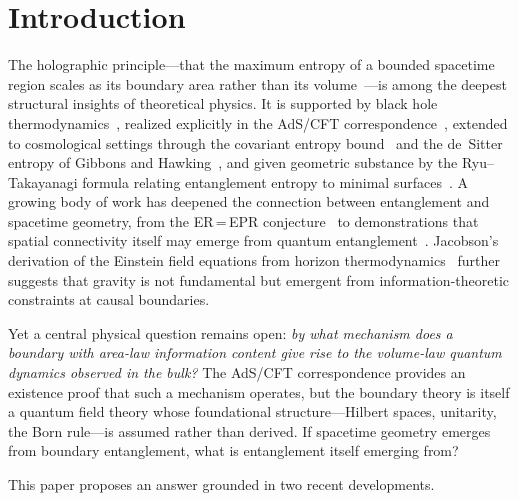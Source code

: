 \documentclass[aps,prd,twocolumn,superscriptaddress,nofootinbib]{revtex4-2}
\begin{document}
\section{Introduction}
\label{sec:intro}

The holographic principle---that the maximum entropy of a bounded spacetime region scales as its boundary area rather than its volume~\cite{tHooft1993,Susskind1995}---is among the deepest structural insights of theoretical physics. It is supported by black hole thermodynamics~\cite{Bekenstein1973,Hawking1975}, realized explicitly in the AdS/CFT correspondence~\cite{Maldacena1999}, extended to cosmological settings through the covariant entropy bound~\cite{Bousso1999} and the de~Sitter entropy of Gibbons and Hawking~\cite{GibbonsHawking1977}, and given geometric substance by the Ryu--Takayanagi formula relating entanglement entropy to minimal surfaces~\cite{RyuTakayanagi2006}. A growing body of work has deepened the connection between entanglement and spacetime geometry, from the ER\,=\,EPR conjecture~\cite{MaldacenaSusskind2013} to demonstrations that spatial connectivity itself may emerge from quantum entanglement~\cite{VanRaamsdonk2010,CaoCarrollMichalakis2017}. Jacobson's derivation of the Einstein field equations from horizon thermodynamics~\cite{Jacobson1995} further suggests that gravity is not fundamental but emergent from information-theoretic constraints at causal boundaries.

Yet a central physical question remains open: \emph{by what mechanism does a boundary with area-law information content give rise to the volume-law quantum dynamics observed in the bulk?} The AdS/CFT correspondence provides an existence proof that such a mechanism operates, but the boundary theory is itself a quantum field theory whose foundational structure---Hilbert spaces, unitarity, the Born rule---is assumed rather than derived. If spacetime geometry emerges from boundary entanglement, what is entanglement itself emerging from?

This paper proposes an answer grounded in two recent developments.
\end{document}
